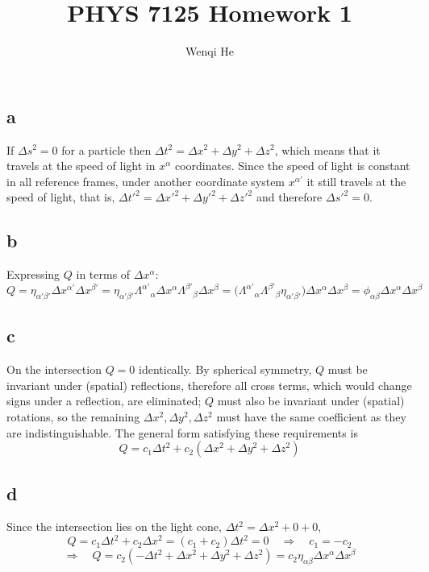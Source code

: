 \documentclass{article}
\title{PHYS 7125 Homework 1}
\author{Wenqi He}
\begin{document}
\maketitle
\section{}
\subsection*{a}
If $\Delta s^2 = 0$ for a particle then $\Delta t^2 = \Delta x^2 + \Delta y^2 + \Delta z^2$, which means that it travels at the speed of light in $x^\alpha$ coordinates. Since the speed of light is constant in all reference frames, under another coordinate system $x^{\alpha'}$ it still travels at the speed of light, that is, $\Delta t'^2 = \Delta x'^2 + \Delta y'^2 + \Delta z'^2$ and therefore $\Delta s'^2 = 0$.
\subsection*{b}
Expressing $Q$ in terms of $\Delta x^\alpha$:
\[ Q = \eta_{\alpha'\beta'}\Delta x^{\alpha'} \Delta x^{\beta'}  
	= \eta_{\alpha'\beta'} \Lambda^{\alpha'}{}_\alpha \Delta x^\alpha  \Lambda^{\beta'}{}_\beta \Delta x^\beta
	= \Big(\Lambda^{\alpha'}{}_\alpha\Lambda^{\beta'}{}_\beta\eta_{\alpha'\beta'}\Big) \Delta x^\alpha \Delta x^\beta
	= \phi_{\alpha\beta}\Delta x^\alpha \Delta x^\beta \]

\subsection*{c}
On the intersection $Q = 0$ identically. By spherical symmetry, $Q$ must be invariant under (spatial) reflections, therefore all cross terms, which would change signs under a reflection, are eliminated; $Q$ must also be invariant under (spatial) rotations, so the remaining $\Delta x^2, \Delta y^2, \Delta z^2$ must have the same coefficient as they are indistinguishable. The general form satisfying these requirements is 
\[ Q = c_1\Delta t^2 + c_2(\Delta x^2 + \Delta y^2 + \Delta z^2) \]
\subsection*{d}
Since the intersection lies on the light cone, $\Delta t^2 = \Delta x^2 + 0 + 0$,
\[ Q = c_1\Delta t^2 + c_2 \Delta x^2 = (c_1  + c_2) \Delta t^2 = 0 \quad\Rightarrow\quad c_1 = -c_2\]
\[ \Rightarrow\quad Q = c_2(-\Delta t ^2 +\Delta x^2 + \Delta y^2 + \Delta z^2) = c_2\eta_{\alpha\beta}\Delta x^\alpha \Delta x^\beta \]
\end{document}
